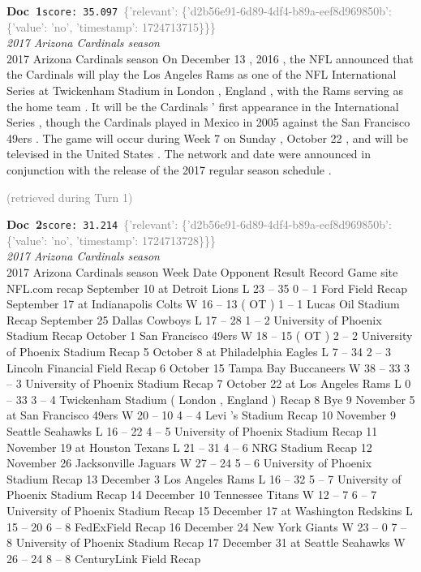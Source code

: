 \documentclass[a4paper,11pt]{article}
\begin{document}
\begin{docenv}
{\footnotesize\textcolor{doccolor}{\textbf{Doc~1}}}\hfill{\tiny\texttt{score:~35.097}}\ {\tiny\textcolor{gray}{\{'relevant': \{'d2b56e91-6d89-4df4-b89a-eef8d969850b': \{'value': 'no', 'timestamp': 1724713715\}\}\}}}\\[3pt]
{\small\textit{2017 Arizona Cardinals season}}\\[2pt]
\vspace{2pt}
{\footnotesize 2017 Arizona Cardinals season
On December 13 , 2016 , the NFL announced that the Cardinals will play the Los Angeles Rams as one of the NFL International Series at Twickenham Stadium in London , England , with the Rams serving as the home team . It will be the Cardinals ' first appearance in the International Series , though the Cardinals played in Mexico in 2005 against the San Francisco 49ers . The game will occur during Week 7 on Sunday , October 22 , and will be televised in the United States . The network and date were announced in conjunction with the release of the 2017 regular season schedule .}
\end{docenv}
\hfill{\tiny\textcolor{gray}{(retrieved during Turn 1)}}
\begin{docenv}
{\footnotesize\textcolor{doccolor}{\textbf{Doc~2}}}\hfill{\tiny\texttt{score:~31.214}}\ {\tiny\textcolor{gray}{\{'relevant': \{'d2b56e91-6d89-4df4-b89a-eef8d969850b': \{'value': 'no', 'timestamp': 1724713728\}\}\}}}\\[3pt]
{\small\textit{2017 Arizona Cardinals season}}\\[2pt]
\vspace{2pt}
{\footnotesize 2017 Arizona Cardinals season
Week Date Opponent Result Record Game site NFL.com recap September 10 at Detroit Lions L 23 -- 35 0 -- 1 Ford Field Recap September 17 at Indianapolis Colts W 16 -- 13 ( OT ) 1 -- 1 Lucas Oil Stadium Recap September 25 Dallas Cowboys L 17 -- 28 1 -- 2 University of Phoenix Stadium Recap October 1 San Francisco 49ers W 18 -- 15 ( OT ) 2 -- 2 University of Phoenix Stadium Recap 5 October 8 at Philadelphia Eagles L 7 -- 34 2 -- 3 Lincoln Financial Field Recap 6 October 15 Tampa Bay Buccaneers W 38 -- 33 3 -- 3 University of Phoenix Stadium Recap 7 October 22 at Los Angeles Rams L 0 -- 33 3 -- 4 Twickenham Stadium ( London , England ) Recap 8 Bye 9 November 5 at San Francisco 49ers W 20 -- 10 4 -- 4 Levi 's Stadium Recap 10 November 9 Seattle Seahawks L 16 -- 22 4 -- 5 University of Phoenix Stadium Recap 11 November 19 at Houston Texans L 21 -- 31 4 -- 6 NRG Stadium Recap 12 November 26 Jacksonville Jaguars W 27 -- 24 5 -- 6 University of Phoenix Stadium Recap 13 December 3 Los Angeles Rams L 16 -- 32 5 -- 7 University of Phoenix Stadium Recap 14 December 10 Tennessee Titans W 12 -- 7 6 -- 7 University of Phoenix Stadium Recap 15 December 17 at Washington Redskins L 15 -- 20 6 -- 8 FedExField Recap 16 December 24 New York Giants W 23 -- 0 7 -- 8 University of Phoenix Stadium Recap 17 December 31 at Seattle Seahawks W 26 -- 24 8 -- 8 CenturyLink Field Recap}
\end{docenv}
\end{document}
